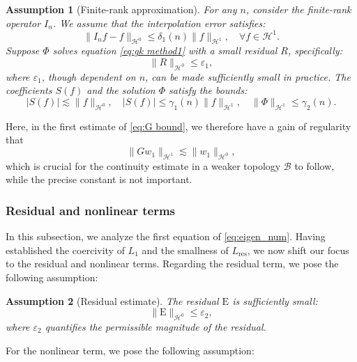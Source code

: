 \documentclass[11pt,a4paper]{article}
\numberwithin{equation}{section}
\newcommand{\Epsilon}{\mathrm{E}}
\newcommand{\tmop}[1]{\ensuremath{\operatorname{#1}}}
\newtheorem{assumption}{Assumption}
\begin{document}
\begin{assumption}[Finite-rank approximation]
  \label{asm:finite_cap}For any $n$, consider the finite-rank operator $I_n$.
  We assume that the interpolation error satisfies:
  \begin{equation}
    \| I_n f - f \|_{\mathcal{H}^0} \leqslant \delta_1 (n) \| f
    \|_{\mathcal{H}^1}, \quad \forall f \in \mathcal{H}^1 . \label{eq:compact}
  \end{equation}
  Suppose $\Phi$ solves equation \eqref{eq:gk method1} with a small residual $R$, specifically:
  \[ \| R \|_{\mathcal{H}^0} \leqslant \varepsilon_1 , \]
  where $\varepsilon_1$, though dependent on $n$, can be made sufficiently
  small in practice. The coefficients $S (f)$ and the solution $\Phi$ satisfy the bounds:
  \begin{equation}
    | S (f) | \lesssim \| f \|_{\mathcal{H}^0},\quad| S (f) | \leqslant \gamma_1 (n) \| f \|_{\mathcal{H}^1},\quad \| \Phi
    \|_{\mathcal{H}^1} \leqslant \gamma_2 (n) . \label{eq:G bound}
  \end{equation}

\end{assumption}
  Here, in the first estimate of \eqref{eq:G bound}, we therefore have a gain of regularity that \[\|Gw_1\|_{\mathcal{H}^1}\lesssim\|w_1\|_{\mathcal{H}^0},\] which is crucial for the continuity estimate in a weaker topology $\mathcal{B}$ to follow, while the precise constant is not important.
\subsubsection{Residual and nonlinear terms}\label{Sec:nonl est}

In this subsection, we analyze the first equation of 
\eqref{eq:eigen_num}. Having established the coercivity of $L_1$ and the smallness of $ L_{\tmop{res}}$, we now shift our focus to the residual and nonlinear
terms. 
Regarding the residual term, we pose the following assumption:
\begin{assumption}[Residual estimate]
  \label{asm:res small}The residual $\Epsilon$ is sufficiently small:
  \[ \| \Epsilon \|_{\mathcal{H}^0} \leqslant \varepsilon_2, \]
  where $\varepsilon_2$ quantifies the
  permissible magnitude of the residual.
\end{assumption}

For the nonlinear term, we pose the following assumption:
\end{document}
